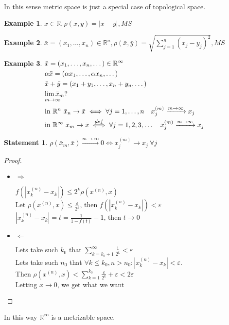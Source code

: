 \documentclass[12pt, fleqn]{article}
\makeatletter
\theoremstyle{definition}
\newtheorem{ex}{Example}
\newcommand\alim[2]{
    \begin{array}[t]{@{}l@{}}
     \lim #1 \\[-1ex] \scriptstyle #2 
    \end{array}
}
\theoremstyle{break}
\theoremstyle{theorem}
\newtheorem{stm}{Statement}[section]
\renewcommand\leq{\leqslant}
\renewcommand\epsilon{\varepsilon}
\newcommand{\R}{\mathbb{R}}
\makeatother
\begin{document}
\noindent
In this sense metric space is just a special case of topological space.
\begin{ex}
  $x \in \R, \rho(x, y) = |x - y|, MS$
\end{ex}
\begin{ex}
  $\bar{x} = (x_1, \dotsc, x_n) \in \R^n, \rho(\bar{x}, \bar{y}) = \sqrt{\sum\limits_{j = 1}^n(x_j - y_j)^2}, MS$
\end{ex}
\begin{ex}
  $\begin{aligned}[t]
    & \bar{x} = (x_1, \dotsc, x_n, \dotso) \in \R^\infty \\ 
    & \alpha\bar{x} = (\alpha x_1, \dotsc, \alpha x_n, \dotso) \\ 
    & \bar{x} + \bar{y} = (x_1 + y_1, \dotsc, x_n + y_n, \dotso)\\
    & \alim{\bar{x}_m}{m \to \infty}?\\
    & \textnormal{in}\ \R^n\ \bar{x}_n \to \bar{x} \iff \forall j = 1,
    \dotsc, n\quad x_j^{(m)} \xrightarrow{m \to \infty} x_j \\ 
    & \textnormal{in}\ \R^{\infty}\ \bar{x}_m \to \bar{x} \overset{def}{\iff} \forall j = 1,2,3,\dotso \quad x_j^{(m)} \xrightarrow{m \to \infty} x_j
  \end{aligned}$
  \begin{stm}
    $\rho(\bar{x}_m, \bar{x}) \xrightarrow{m \to \infty} 0 \iff x_j^{(m)} \to x_j\ \forall j$\\
  \end{stm}
  \begin{proof}\leavevmode
    \begin{itemize}
      \item $\Rightarrow$

      $f(|x^{(n)}_k - x_k|) \leq 2^k \rho(x^{(n)}, x)$ \\
      Let $\rho(x^{(n)}, x) \le \frac{\epsilon}{2^k}$,  then  $f(|x^{(n)}_k - x_k|) < \epsilon$ \\
      $|x^{(n)}_k - x_k| = t = \frac{1}{1 - f(t)} - 1$, then $t \rightarrow 0$
      \item $\Leftarrow$

      Lets take such $k_0$ that $\sum\limits_{k=k_0+1}^{\infty} \frac{1}{2^k} < \epsilon$ \\
      Lets take such $n_0$ that  $\forall k \leq k_0, n > n_0: |x_k^{(n)} - x_k| < \epsilon$. \\ 
      Then $\rho(x^{(n)}, x) < \sum\limits_{k=1}^{k_0} \frac{\epsilon}{2^k} + \epsilon < 2 \epsilon$ \\
      Letting  $x \rightarrow 0$, we get what we want \qedhere
    \end{itemize}
  \end{proof}
  \noindent
  In this way $\R^\infty$ is a metrizable space.
\end{ex}
\end{document}
